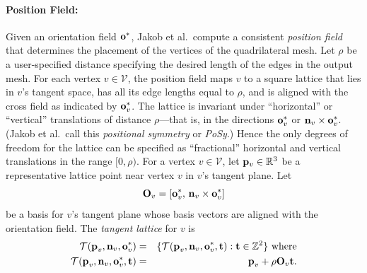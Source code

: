 \paragraph*{Position Field:}
Given an orientation field $\mathbf{o}^*$, Jakob et al.\ compute a consistent \emph{position field} that determines the placement of the vertices of the quadrilateral mesh. Let $\rho$ be a user-specified distance specifying the desired length of the edges in the output mesh. For each vertex $v \in \mathcal{V}$, the position field maps $v$ to a square lattice that lies in $v$'s tangent space, has all its edge lengths equal to $\rho$, and is aligned with the cross field as indicated by $\mathbf{o}^*_v$. The lattice is invariant under ``horizontal'' or ``vertical'' translations of distance $\rho$---that is, in the directions $\mathbf{o}^*_v$ or $\textbf{n}_v\times\mathbf{o}^*_v$. (Jakob et al.\ call this \emph{positional symmetry} or \emph{PoSy}.) Hence the only degrees of freedom for the lattice can be specified as ``fractional'' horizontal and vertical translations in the range $[0, \rho)$. For a vertex $v \in \mathcal{V}$, let $\mathbf{p}_v \in \mathbb{R}^3$ be a representative lattice point near vertex $v$ in $v$'s tangent plane. Let
\begin{equation*}
\textbf{O}_v =[\mathbf{o}^*_v,\,\textbf{n}_v\times\mathbf{o}^*_v]
\label{eq:frame}
\end{equation*}
be a basis for $v$'s tangent plane whose basis vectors are aligned with the orientation field.
The \emph{tangent lattice} for $v$ is
\begin{eqnarray*}
\mathcal{T}(\textbf{p}_v, \textbf{n}_v, \mathbf{o}^*_v) & = & \{ \mathcal{T}(\textbf{p}_v, \textbf{n}_v, \mathbf{o}^*_v, \textbf{t}): \mathbf{t} \in \mathbb{Z}^2 \}  \mbox{~where}  \\
\mathcal{T}(\textbf{p}_v, \textbf{n}_v, \mathbf{o}^*_v, \textbf{t}) & = & \textbf{p}_v + \rho \textbf{O}_v \textbf{t}.
\end{eqnarray*}


